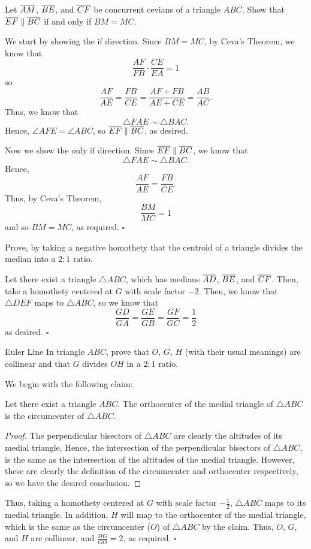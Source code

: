 \documentclass{article}
\begin{document}
\begin{problem}[3.6]{}
Let $\overline{AM}$, $\overline{BE}$, and $\overline{CF}$ be concurrent cevians of a triangle $ABC$. Show that $\overline{EF}\parallel\overline{BC}$ if and only if $BM=MC$.
\end{problem}
We start by showing the if direction. Since $BM = MC$, by Ceva's Theorem, we know that \[\dfrac{AF}{FB}\cdot\dfrac{CE}{EA} = 1\] so \[\dfrac{AF}{AE} = \dfrac{FB}{CE} = \dfrac{AF+FB}{AE+CE} = \dfrac{AB}{AC}.\] Thus, we know that \[\triangle FAE \sim \triangle BAC.\] Hence, $\angle AFE = \angle ABC$, so $\overline{EF}\parallel\overline{BC}$, as desired.

Now we show the only if direction. Since $\overline{EF}\parallel\overline{BC}$, we know that \[\triangle FAE \sim \triangle BAC.\] Hence, \[\dfrac{AF}{AE} = \dfrac{FB}{CE}.\] Thus, by Ceva's Theorem, \[\dfrac{BM}{MC} = 1\] and so $BM = MC$, as required. $\square$

\begin{problem}[3.12]{}
Prove, by taking a negative homothety that the centroid of a triangle divides the median into a $2:1$ ratio.
\end{problem}
Let there exist a triangle $\triangle ABC$, which has medians $\overline{AD}$, $\overline{BE}$, and $\overline{CF}$. Then, take a homothety centered at $G$ with scale factor $-2$. Then, we know that $\triangle DEF$ maps to $\triangle ABC$, so we know that \[\dfrac{GD}{GA} = \dfrac{GE}{GB} = \dfrac{GF}{GC} = \dfrac{1}{2}\] as desired. $\square$

\begin{problem}[3.13]{Euler Line}
In triangle $ABC$, prove that $O$, $G$, $H$ (with their usual meanings) are collinear and that $G$ divides $OH$ in a $2:1$ ratio.
\end{problem}
We begin with the following claim:
\begin{claim*}
Let there exist a triangle $ABC$. The orthocenter of the medial triangle of $\triangle ABC$ is the circumcenter of $\triangle ABC$.
\end{claim*}
\begin{proof}
The perpendicular bisectors of $\triangle ABC$ are clearly the altitudes of its medial triangle. Hence, the intersection of the perpendicular bisectors of $\triangle ABC$, is the same as the intersection of the altitudes of the medial triangle. However, these are clearly the definition of the circumcenter and orthocenter respectively, so we have the desired conclusion.
\end{proof}

Thus, taking a homothety centered at $G$ with scale factor $-\tfrac{1}{2}$, $\triangle ABC$ maps to its medial triangle. In addition, $H$ will map to the orthocenter of the medial triangle, which is the same as the circumcenter ($O$) of $\triangle ABC$ by the claim. Thus, $O$, $G$, and $H$ are collinear, and $\frac{HG}{GO} = 2$, as required. $\square$
\end{document}
